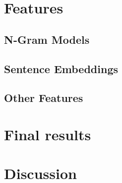 \section{Features}
\subsection{N-Gram Models}
\label{sec:ngram}

\subsection{Sentence Embeddings}
\subsection{Other Features}

\section{Final results}
\label{sec:final}

\section{Discussion}
